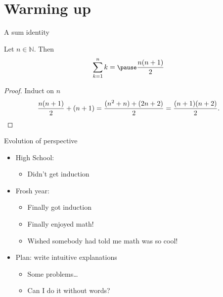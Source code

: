 \documentclass{fkpresentation}
\begin{document}
\section{Warming up}
\begin{frame}{A sum identity}{}
  \begin{theorem}
    Let $n \in \mathbb{N}$. Then
    \[\small
      \sum_{k=1}^n k = \pause \frac{n(n+1)}{2}
    \]
  \end{theorem}\pause
  \begin{proof}
    Induct on $n$
    \[\small
      \frac{n(n+1)}{2} + (n+1) = \frac{(n^2 + n) + (2n+2)}{2} = \frac{(n+1)(n+2)}{2}.
    \]
  \end{proof}
\end{frame}
\begin{frame}{Evolution of perspective}{}
  \begin{itemize}
    \item High School:
      \begin{itemize}
        \item Didn't get induction
      \end{itemize}
    \item Frosh year:
      \begin{itemize}
        \item Finally got induction
        \item Finally enjoyed math!
        \item Wished somebody had told me math was so cool!
      \end{itemize}
    \item Plan: write intuitive explanations
      \begin{itemize}
        \item Some problems\ldots
        \item Can I do it without words?
      \end{itemize}
  \end{itemize}
\end{frame}
\end{document}
